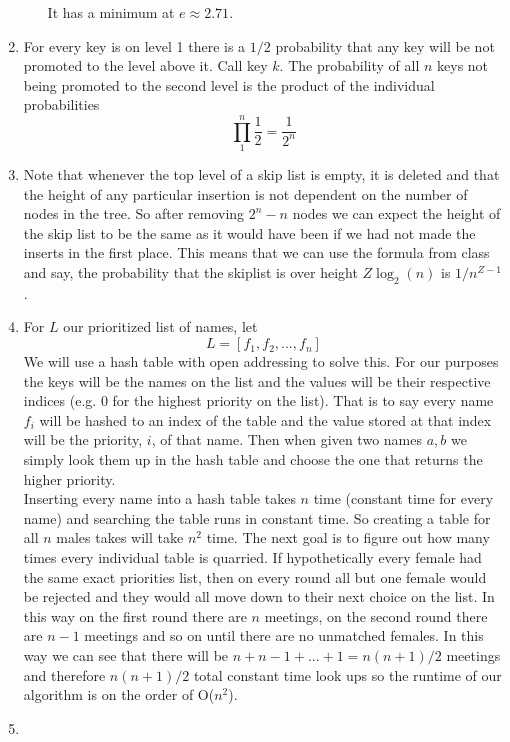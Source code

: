 \documentclass[11pt]{article}
\begin{document}
\begin{enumerate}
\begin{enumerate}
\begin{center}
		\end{center}
			It has a minimum at $e \approx 2.71$.
		
	\end{enumerate}
	\item For every key is on level 1 there is a $1/2$ probability that any key will be not
		promoted to the level above it. Call key
		$k$. The probability of all $n$ keys
		not being promoted to the second level is the product
		of the individual probabilities 
		$$\prod_1^n \frac{1}{2} =\frac{1}{2^n}$$
	\item Note that whenever the top level of a skip list is empty, it is
		deleted and that the height of any particular insertion is not
		dependent on the number of nodes in the tree.
		So after removing $2^n - n$ nodes we can expect the height of
		the skip list to be the same as it would have been if we had not
		made the inserts in the first place. This means that we can use
		the formula from class and say, the probability that the skiplist is
		over height $Z\log_2(n)$ is $1/n^{Z-1}$.
	\item For $L$ our prioritized list of names, let 
		$$L = [f_1, f_2, ... ,f_n]$$
		We will use a hash table with open addressing to solve this.
		For our purposes the keys will be the names on the list and the
		values will be their respective indices (e.g. $0$ for the
		highest priority on the list). That is to say every
		name $f_i$ will be hashed to an index of the table and the value stored
		at that index will be the priority, $i$, of that name.
		Then when given two names $a,b$ we simply look them up in the
		hash table and choose the one that returns the higher priority.\\
		Inserting every name into a hash table takes $n$ time (constant time for
		every name) and searching the table runs in constant time. So
		creating a table for all $n$ males takes will take $n^2$ time.
		The next goal is to figure out how many times every individual
		table is quarried. If hypothetically every female had the same
		exact priorities list, then on every round all but one
		female would be rejected and they would all move down to their
		next choice on the list. In this way on the first round there
		are $n$ meetings, on the second round there are $n-1$ meetings
		and so on until there are no unmatched females. In this way we
		can see that there will be $n+n-1+...+1 = n(n+1)/2$ meetings and
		therefore $n(n+1)/2$ total constant time look ups so the runtime
		of our algorithm is on the order of O($n^2$).
	\item		

\end{enumerate}
\end{document}
